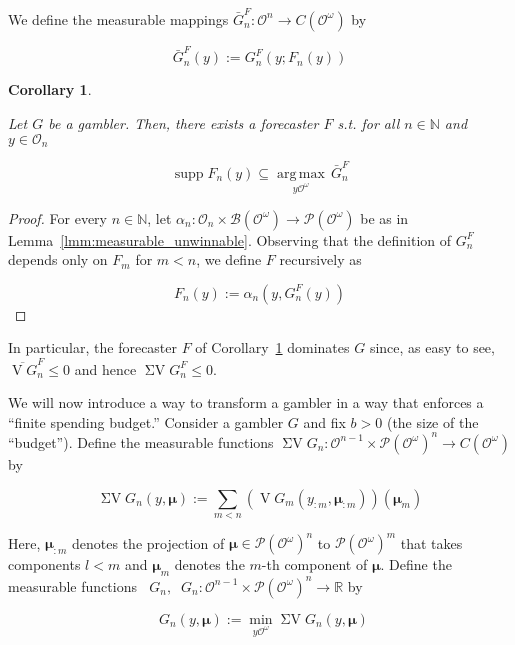 \documentclass[11pt]{article}
\theoremstyle{definition}
\theoremstyle{plain}
\newtheorem{corollary}{Corollary}%
\newcommand{\Nats}{\mathbb{N}}
\newcommand{\Reals}{\mathbb{R}}
\newcommand{\Argmax}[1]{\underset{#1}{\operatorname{arg\,max}}\,}
\newcommand{\PM}{\mathcal{P}}
\DeclareMathOperator{\Sp}{supp}
\newcommand{\Ob}{\mathcal{O}}
\newcommand{\OO}{\Ob^\omega}
\newcommand{\PMO}{\PM(\OO)}
\newcommand{\Gm}{\mathcal{B}}
\newcommand{\GMO}{\Gm(\OO)}
\newcommand{\CO}{C(\OO)}
\DeclareMathOperator{\V}{V}
\DeclareMathOperator{\SV}{\Sigma V}
\DeclareMathOperator{\SVM}{\Sigma V_{\min}}
\DeclareMathOperator{\SVX}{\Sigma V_{\max}}
\newcommand{\BM}{\bm{\mu}}
\begin{document}
We define the measurable mappings $\bar{G}^F_n: \Ob^n \rightarrow \CO$ by

\begin{equation}
\bar{G}^F_n\left(y\right) := G^F_n\left(y;F_n\left(y\right)\right)
\end{equation}

\begin{corollary}
\label{crl:dominate_one}

Let $G$ be a gambler. Then, there exists a forecaster $F$ s.t. for all $n \in \Nats$ and $y \in \Ob_n$

\begin{equation}
\Sp F_n\left(y\right) \subseteq \Argmax{y\OO} \bar{G}^F_n
\end{equation}

\end{corollary}

\begin{proof}

For every $n \in \Nats$, let $\alpha_n: \Ob_n \times \GMO \rightarrow \PMO$ be as in Lemma~\ref{lmm:measurable_unwinnable}. Observing that the definition of $G^F_n$ depends only on $F_m$ for $m < n$, we define $F$ recursively as

\[F_n\left(y\right):=\alpha_n\left(y,G^F_n\left(y\right)\right)\]
\end{proof}

In particular, the forecaster $F$ of Corollary~\ref{crl:dominate_one} dominates $G$ since, as easy to see, $\overline{\V G}^F_n \leq 0$ and hence $\SV G^F_n \leq 0$.

We will now introduce a way to transform a gambler in a way that enforces a \enquote{finite spending budget.} Consider a gambler $G$ and fix $b > 0$ (the size of the \enquote{budget}). Define the measurable functions $\SV G_n: \Ob^{n-1} \times \PMO^n  \rightarrow \CO$ by

\begin{equation}
\SV G_n\left(y,\BM\right) := \sum_{m < n} \left(\V G_m\left(y_{:m},\BM_{:m}\right)\right)\left(\BM_m\right)
\end{equation}

Here, $\BM_{:m}$ denotes the projection of $\BM \in \PMO^n$ to $\PMO^m$ that takes components $l < m$ and $\BM_m$ denotes the $m$-th component of $\BM$. Define the measurable functions $\SVM G_n, \SVX G_n: \Ob^{n-1} \times \PMO^n  \rightarrow \Reals$ by

\begin{equation}
\SVM G_n\left(y,\BM\right) := \min_{y\OO}{\SV G_n\left(y,\BM\right)}
\end{equation}
\end{document}
